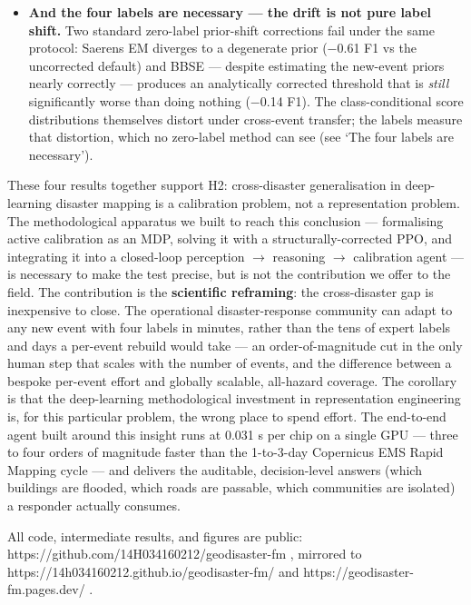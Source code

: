 \documentclass[sn-nature,lineno]{sn-jnl}
\theoremstyle{thmstyleone}
\theoremstyle{thmstyletwo}
\theoremstyle{thmstylethree}
\begin{document}
\begin{itemize}
  captured in four chips of pool labels.
\item
  \textbf{And the four labels are necessary --- the drift is not pure label
  shift.} Two standard zero-label prior-shift corrections fail under
  the same protocol: Saerens EM diverges to a degenerate prior
  ($-$0.61 F1 vs the uncorrected default) and BBSE --- despite estimating
  the new-event priors nearly correctly --- produces an analytically
  corrected threshold that is \emph{still} significantly worse than doing
  nothing ($-$0.14 F1). The class-conditional score distributions
  themselves distort under cross-event transfer; the labels measure
  that distortion, which no zero-label method can see (see `The four labels are necessary').
\end{itemize}

These four results together support H2: cross-disaster generalisation
in deep-learning disaster mapping is a calibration problem, not a
representation problem. The methodological apparatus we built to reach
this conclusion --- formalising active calibration as an MDP, solving it
with a structurally-corrected PPO, and integrating it into a closed-loop
perception $\rightarrow$ reasoning $\rightarrow$ calibration agent --- is necessary to make the
test precise, but is not the contribution we offer to the field. The
contribution is the \textbf{scientific reframing}: the cross-disaster gap is
inexpensive to close. The operational disaster-response community can
adapt to any new event with four labels in minutes, rather than the tens
of expert labels and days a per-event rebuild would take --- an
order-of-magnitude cut in the only human step that scales with the
number of events, and the difference between a bespoke per-event effort
and globally scalable, all-hazard coverage. The corollary is that the
deep-learning methodological investment in representation engineering
is, for this particular problem, the wrong place to spend effort. The
end-to-end agent built around this insight runs at 0.031 s per chip on a
single GPU --- three to four orders of magnitude faster than the 1-to-3-day
Copernicus EMS Rapid Mapping \cite{copernicus_ems} cycle --- and delivers the auditable,
decision-level answers (which buildings are flooded, which roads are
passable, which communities are isolated) a responder actually consumes.

All code, intermediate results, and figures are public:
https://github.com/14H034160212/geodisaster-fm , mirrored to
https://14h034160212.github.io/geodisaster-fm/ and
https://geodisaster-fm.pages.dev/ .
\end{document}
